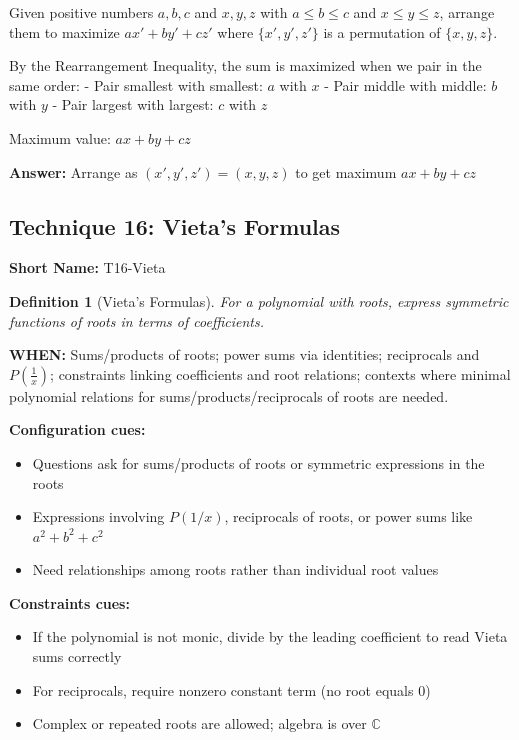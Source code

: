 \documentclass[12pt]{article}
\newtheorem{definition}{Definition}[section]
\newenvironment{problem}[1]
{\begin{tcolorbox}[colback=blue!5!white,colframe=blue!75!black,title={#1}]}{\end{tcolorbox}}
\newenvironment{solution}
{\begin{tcolorbox}[colback=green!5!white,colframe=green!75!black,title={Solution}]}{\end{tcolorbox}}
\begin{document}
\begin{problem}{Example: Maximizing a Sum}
Given positive numbers $a, b, c$ and $x, y, z$ with $a \leq b \leq c$ and $x \leq y \leq z$, arrange them to maximize $ax' + by' + cz'$ where $\{x', y', z'\}$ is a permutation of $\{x, y, z\}$.
\end{problem}

\begin{solution}
By the Rearrangement Inequality, the sum is maximized when we pair in the same order:
- Pair smallest with smallest: $a$ with $x$
- Pair middle with middle: $b$ with $y$  
- Pair largest with largest: $c$ with $z$

Maximum value: $ax + by + cz$

\textbf{Answer:} Arrange as $(x', y', z') = (x, y, z)$ to get maximum $ax + by + cz$
\end{solution}

\subsection{Technique 16: Vieta's Formulas}
\textbf{Short Name:} T16-Vieta

\begin{definition}[Vieta's Formulas]
For a polynomial with roots, express symmetric functions of roots in terms of coefficients.
\end{definition}

\textbf{WHEN:} Sums/products of roots; power sums via identities; reciprocals and \(P\!\left(\tfrac{1}{x}\right)\); constraints linking coefficients and root relations; contexts where minimal polynomial relations for sums/products/reciprocals of roots are needed.

\textbf{Configuration cues:}
\begin{itemize}
    \item Questions ask for sums/products of roots or symmetric expressions in the roots
    \item Expressions involving \(P(1/x)\), reciprocals of roots, or power sums like \(a^2+b^2+c^2\)
    \item Need relationships among roots rather than individual root values
\end{itemize}

\textbf{Constraints cues:}
\begin{itemize}
    \item If the polynomial is not monic, divide by the leading coefficient to read Vieta sums correctly
    \item For reciprocals, require nonzero constant term (no root equals \(0\))
    \item Complex or repeated roots are allowed; algebra is over \(\mathbb{C}\)
\end{itemize}
\end{document}
